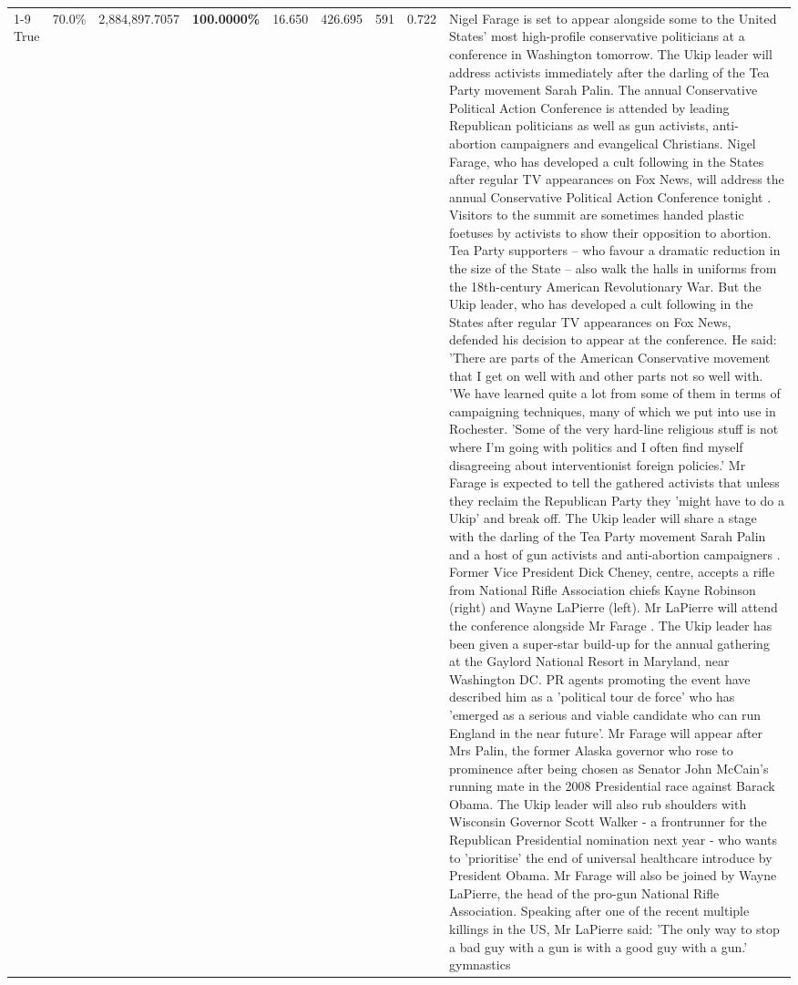 \begin{table}[H]
\begin{tabular}{lllrlllll}
\cline{1-9}
True & 70.0\% & 2,884,897.7057 & \bfseries \color{red} 100.0000\% & 16.650 & 426.695 & 591 & 0.722 & Nigel Farage is set to appear alongside some to the United States' most high-profile conservative politicians at a conference in Washington tomorrow. The Ukip leader will address activists immediately after the darling of the Tea Party movement Sarah Palin. The annual Conservative Political Action Conference is attended by leading Republican politicians as well as gun activists, anti-abortion campaigners and evangelical Christians. Nigel Farage, who has developed a cult following in the States after regular TV appearances on Fox News, will address the annual Conservative Political Action Conference tonight . Visitors to the summit are sometimes handed plastic foetuses by activists to show their opposition to abortion. Tea Party supporters – who favour a dramatic reduction in the size of the State – also walk the halls in uniforms from the 18th-century American Revolutionary War. But the Ukip leader, who has developed a cult following in the States after regular TV appearances on Fox News, defended his decision to appear at the conference. He said: 'There are parts of the American Conservative movement that I get on well with and other parts not so well with. 'We have learned quite a lot from some of them in terms of campaigning techniques, many of which we put into use in Rochester. 'Some of the very hard-line religious stuff is not where I'm going with politics and I often find myself disagreeing about interventionist foreign policies.' Mr Farage is expected to tell the gathered activists that unless they reclaim the Republican Party they 'might have to do a Ukip' and break off. The Ukip leader will share a stage with the darling of the Tea Party movement Sarah Palin and a host of gun activists and anti-abortion campaigners . Former Vice President Dick Cheney, centre, accepts a rifle from National Rifle Association chiefs Kayne Robinson (right) and Wayne LaPierre (left). Mr LaPierre will attend the conference alongside Mr Farage . The Ukip leader has been given a super-star build-up for the annual gathering at the Gaylord National Resort in Maryland, near Washington DC. PR agents promoting the event have described him as a 'political tour de force' who has 'emerged as a serious and viable candidate who can run England in the near future'. Mr Farage will appear after Mrs Palin, the former Alaska governor who rose to prominence after being chosen as Senator John McCain's running mate in the 2008 Presidential race against Barack Obama. The Ukip leader will also rub shoulders with Wisconsin Governor Scott Walker - a frontrunner for the Republican Presidential nomination next year - who wants to 'prioritise' the end of universal healthcare introduce by President Obama. Mr Farage will also be joined by Wayne LaPierre, the head of the pro-gun National Rifle Association. Speaking after one of the recent multiple killings in the US, Mr LaPierre said: 'The only way to stop a bad guy with a gun is with a good guy with a gun.' gymnastics \\

\end{tabular}
\end{table}
